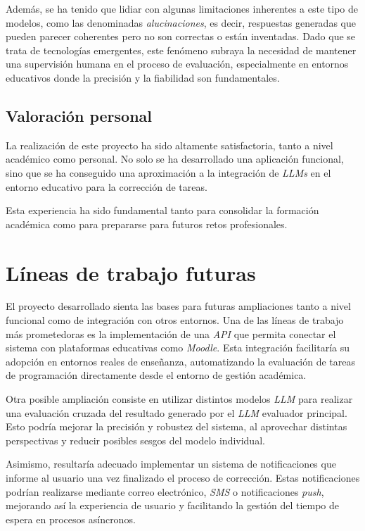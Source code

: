 Además, se ha tenido que lidiar con algunas limitaciones inherentes a este tipo de modelos, como las denominadas \textit{alucinaciones}, es decir, respuestas generadas que pueden parecer coherentes pero no son correctas o están inventadas. Dado que se trata de tecnologías emergentes, este fenómeno subraya la necesidad de mantener una supervisión humana en el proceso de evaluación, especialmente en entornos educativos donde la precisión y la fiabilidad son fundamentales.

\subsection{Valoración personal}

La realización de este proyecto ha sido altamente satisfactoria, tanto a nivel académico como personal. No solo se ha desarrollado una aplicación funcional, sino que se ha conseguido una aproximación a la integración de \textit{LLMs} en el entorno educativo para la corrección de tareas. 

Esta experiencia ha sido fundamental tanto para consolidar la formación académica como para prepararse para futuros retos profesionales.

\section{Líneas de trabajo futuras}

El proyecto desarrollado sienta las bases para futuras ampliaciones tanto a nivel funcional como de integración con otros entornos. Una de las líneas de trabajo más prometedoras es la implementación de una \textit{API} que permita conectar el sistema con plataformas educativas como \textit{Moodle}. Esta integración facilitaría su adopción en entornos reales de enseñanza, automatizando la evaluación de tareas de programación directamente desde el entorno de gestión académica.

Otra posible ampliación consiste en utilizar distintos modelos \textit{LLM} para realizar una evaluación cruzada del resultado generado por el \textit{LLM} evaluador principal. Esto podría mejorar la precisión y robustez del sistema, al aprovechar distintas perspectivas y reducir posibles sesgos del modelo individual.

Asimismo, resultaría adecuado implementar un sistema de notificaciones que informe al usuario una vez finalizado el proceso de corrección. Estas notificaciones podrían realizarse mediante correo electrónico, \textit{SMS} o notificaciones \textit{push}, mejorando así la experiencia de usuario y facilitando la gestión del tiempo de espera en procesos asíncronos.